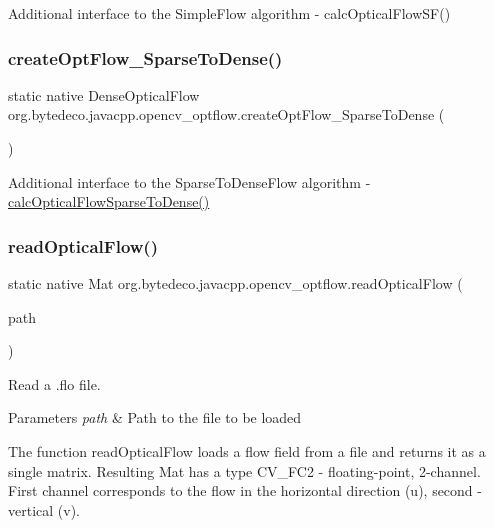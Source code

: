 Additional interface to the Simple\+Flow algorithm -\/ calc\+Optical\+Flow\+S\+F() \mbox{\label{group__optflow_ga2033e98010d9ac8b150503a107601946}} 
\subsubsection{\texorpdfstring{create\+Opt\+Flow\+\_\+\+Sparse\+To\+Dense()}{createOptFlow\_SparseToDense()}}
{\footnotesize\ttfamily static native Dense\+Optical\+Flow org.\+bytedeco.\+javacpp.\+opencv\+\_\+optflow.\+create\+Opt\+Flow\+\_\+\+Sparse\+To\+Dense (\begin{DoxyParamCaption}{ }\end{DoxyParamCaption})\hspace{0.3cm}{\ttfamily [static]}}

Additional interface to the Sparse\+To\+Dense\+Flow algorithm -\/ \hyperlink{group__optflow_gab202f6c782e9356cf2a96620732785a9}{calc\+Optical\+Flow\+Sparse\+To\+Dense()} \mbox{\label{group__optflow_ga8adc9b054c1518ab41c20d8ada51b9b7}} 
\subsubsection{\texorpdfstring{read\+Optical\+Flow()}{readOpticalFlow()}}
{\footnotesize\ttfamily static native Mat org.\+bytedeco.\+javacpp.\+opencv\+\_\+optflow.\+read\+Optical\+Flow (\begin{DoxyParamCaption}\item[{@Str Byte\+Pointer}]{path }\end{DoxyParamCaption})\hspace{0.3cm}{\ttfamily [static]}}



Read a .flo file. 


\begin{DoxyParams}{Parameters}
{\em path} & Path to the file to be loaded \\
\hline
\end{DoxyParams}
The function read\+Optical\+Flow loads a flow field from a file and returns it as a single matrix. Resulting Mat has a type C\+V\+\_\+F\+C2 -\/ floating-\/point, 2-\/channel. First channel corresponds to the flow in the horizontal direction (u), second -\/ vertical (v). \mbox{\label{group__optflow_gad1ff5ca68f3f39b0547c8d249b99185b}} 
